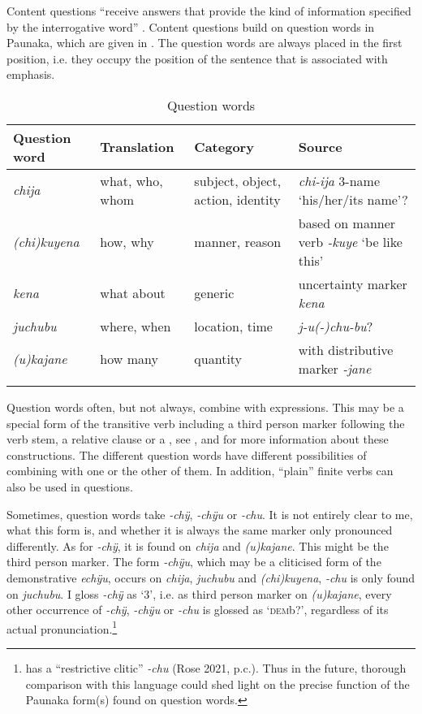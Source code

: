 Content questions “receive answers that provide the kind of information specified by the interrogative word” \citep[291]{Koenig2007}. Content questions build on question words in Paunaka, which are given in . The question words are always placed in the first position, i.e. they occupy the position of the sentence that is associated with emphasis.

\begin{table}
\caption{Question words}
\begin{tabularx}{\textwidth}{l>{\raggedright\arraybackslash}p{2.2cm}QQ}
\lsptoprule
Question word & Translation & Category & Source\\
\midrule
\textit{chija} & what, who, whom & subject, object, action, identity & \textit{chi-ija} 3-name ‘his/her/its name’?\\
\textit{(chi)kuyena} & how, why & manner, reason & based on manner verb \textit{-kuye} ‘be like this’\\
\textit{kena} & what about & generic & uncertainty marker \textit{kena}\\
\textit{juchubu} & where, when & location, time & \textit{j-u(-)chu-bu}? \\
\textit{(u)kajane} & how many & quantity & with distributive marker \textit{-jane} \\
\lspbottomrule
 \end{tabularx}
\label{table:QuestionWords}
\end{table}

Question words often, but not always, combine with  expressions. This may be a special form of the transitive verb including a third person marker following the verb stem, a relative clause or a , see ,  and  for more information about these constructions. The different question words have different possibilities of combining with one or the other of them. In addition, “plain” finite verbs can also be used in questions.

Sometimes, question words take \textit{-chÿ}, \textit{-chÿu} or \textit{-chu}. It is not entirely clear to me, what this form is, and whether it is always the same marker only pronounced differently. As for \textit{-chÿ}, it is found on \textit{chija} and \textit{(u)kajane}. This might be the third person marker. The form \textit{-chÿu}, which may be a cliticised form of the demonstrative \textit{echÿu}, occurs on \textit{chija}, \textit{juchubu} and \textit{(chi)kuyena}, \textit{-chu} is only found on \textit{juchubu}. I gloss \textit{-chÿ} as ‘3’, i.e. as third person marker on \textit{(u)kajane}, every other occurrence of \textit{-chÿ}, \textit{-chÿu} or \textit{-chu} is glossed as ‘\textsc{dem}b?’, regardless of its actual pronunciation.\footnote{ has a “restrictive clitic” \textit{-chu} (Rose 2021, p.c.). Thus in the future, thorough comparison with this language could shed light on the precise function of the Paunaka form(s) found on question words.}

